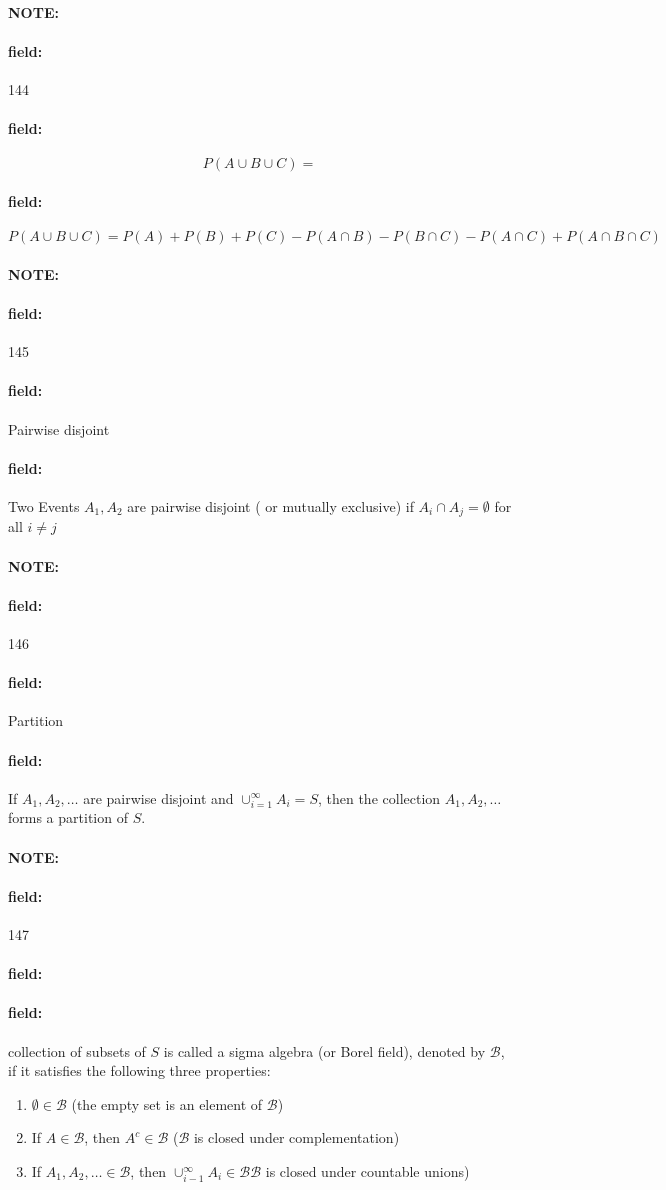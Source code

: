\documentclass[12pt]{article}
\newenvironment{note}{\paragraph{NOTE:}}{}
\newenvironment{field}{\paragraph{field:}}{}
\begin{document}
\begin{note} \begin{field} \tiny 144 \end{field}
  \begin{field}
    $$P(A \cup B \cup C) =  $$
  \end{field}
  \begin{field}
    $$P(A \cup B \cup C) =  P(A) + P(B) + P(C) - P(A \cap B) - P(B\cap C) - P(A \cap C) + P(A \cap B \cap C)$$
  \end{field}
\end{note}



\begin{note} \begin{field} \tiny 145 \end{field}
  \begin{field}
    Pairwise disjoint
  \end{field}
    \begin{field}
        Two Events $A_1, A_2$ are pairwise disjoint ( or mutually exclusive) if $A_i \cap A_j = \emptyset $ for all $i \neq j$
    \end{field}
\end{note}

\begin{note} \begin{field} \tiny 146 \end{field}
    \begin{field}
      Partition
    \end{field}
    \begin{field}
        If $A_1, A_2, \ldots$ are pairwise disjoint and $\cup_{i=1}^\infty A_i = S$, then the collection $A_1, A_2, \ldots$ forms a partition of $S$.
    \end{field}
\end{note}

\begin{note} \begin{field} \tiny 147 \end{field}
    \begin{field}
    \end{field}
    \begin{field}
         collection of subsets of $S$ is called a sigma algebra (or Borel field), denoted by $\mathcal{B}$, if it satisfies the following three properties:
            \begin{enumerate}
              \item $\emptyset \in \mathcal{B}$ (the empty set is an element of $\mathcal{B}$)
              \item If $A \in \mathcal{B}$, then $A^c \in \mathcal{B}$ ($\mathcal{B}$ is closed under complementation)
              \item If $A_1, A_2, \ldots \in \mathcal{B}$, then $\cup_{i-1}^\infty A_i \in \mathcal{B} \mathcal{B}$ is closed under countable unions)
            \end{enumerate}
    \end{field}
\end{note}
\end{document}
